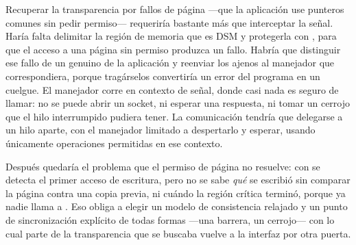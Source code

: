 Recuperar la transparencia por fallos de página —que la aplicación use
punteros comunes sin pedir permiso— requeriría bastante más que interceptar la
señal. Haría falta delimitar la región de memoria que es DSM y protegerla con
, para que el acceso a una página sin permiso produzca un
fallo. Habría que distinguir ese fallo de un  genuino de la
aplicación y reenviar los ajenos al manejador que correspondiera, porque
tragárselos convertiría un error del programa en un cuelgue. El manejador
corre en contexto de señal, donde casi nada es seguro de llamar: no se puede
abrir un socket, ni esperar una respuesta, ni tomar un cerrojo que el hilo
interrumpido pudiera tener. La comunicación tendría que delegarse a un hilo
aparte, con el manejador limitado a despertarlo y esperar, usando únicamente
operaciones permitidas en ese contexto.

Después quedaría el problema que el permiso de página no resuelve: con
 se detecta el primer acceso de escritura, pero no se sabe
\emph{qué} se escribió sin comparar la página contra una copia previa, ni
cuándo la región crítica terminó, porque ya nadie llama a . Eso
obliga a elegir un modelo de consistencia relajado y un punto de
sincronización explícito de todas formas —una barrera, un cerrojo— con lo
cual parte de la transparencia que se buscaba vuelve a la interfaz por otra
puerta.

